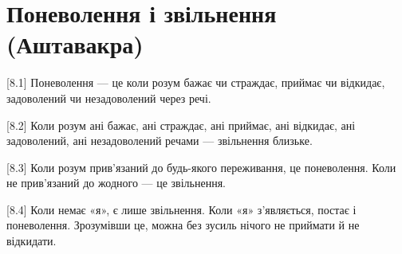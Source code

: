 \chapter[Аштавакра]{Поневолення і звільнення (Аштавакра)}

[8.1] Поневолення --- це коли розум бажає чи страждає, приймає чи відкидає, задоволений чи незадоволений через речі.

[8.2] Коли розум ані бажає, ані страждає, ані приймає, ані відкидає, ані задоволений, ані незадоволений речами --- звільнення близьке.

[8.3] Коли розум прив'язаний до будь-якого переживання, це поневолення. Коли не прив'язаний до жодного --- це звільнення.

[8.4] Коли немає «я», є лише звільнення. Коли «я» з'являється, постає і поневолення. Зрозумівши це, можна без зусиль нічого не приймати й не відкидати.
